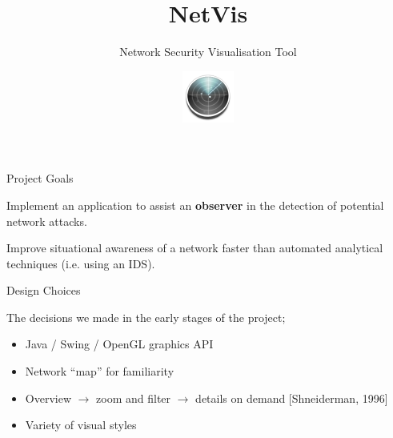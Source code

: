 \documentclass{beamer}
\begin{document}
    \title{NetVis}
    \subtitle{Network Security Visualisation Tool}
    \date{}

    \author{\includegraphics[width=64px,height=64px]{img/netvis.png}}

    \begin{frame}
        \titlepage
    \end{frame}

    \begin{frame}{Project Goals}

        Implement an application to assist an \textbf{observer} in the
        detection of potential network attacks.\\ \bigskip

        Improve situational awareness of a network faster than automated
        analytical techniques (i.e. using an IDS).\

    \end{frame}

    \begin{frame}{Design Choices}

        The decisions we made in the early stages of the project;

        \begin{itemize}
            \item{Java / Swing / OpenGL graphics API}
            \item{Network ``map'' for familiarity}
            \item{Overview $\rightarrow$ zoom and filter $\rightarrow$ details
            on demand} [Shneiderman, 1996]
            \item{Variety of visual styles}
        \end{itemize}

    \end{frame}
\end{document}
